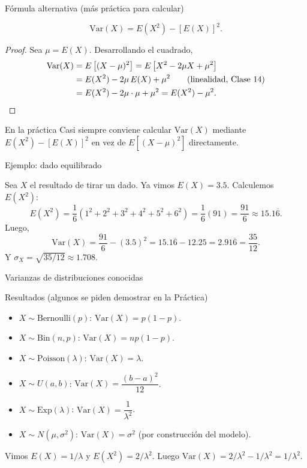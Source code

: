 \documentclass[aspectratio=169,11pt]{beamer}
\begin{document}
\begin{frame}{Fórmula alternativa (más práctica para calcular)}
\begin{theorem}
\[
\text{Var}(X) = E(X^2) - [E(X)]^2.
\]
\end{theorem}

\begin{proof}
Sea $\mu = E(X)$. Desarrollando el cuadrado,
\begin{align*}
\text{Var}(X) &= E\left[(X-\mu)^2\right] = E\left[X^2 - 2\mu X + \mu^2\right] \\
&= E(X^2) - 2\mu\, E(X) + \mu^2 \qquad \text{(linealidad, Clase 14)}\\
&= E(X^2) - 2\mu \cdot \mu + \mu^2 = E(X^2) - \mu^2. \qedhere
\end{align*}
\end{proof}

\begin{alertblock}{En la práctica}
Casi siempre conviene calcular $\text{Var}(X)$ mediante $E(X^2) - [E(X)]^2$ en vez de $E[(X-\mu)^2]$ directamente.
\end{alertblock}
\end{frame}

\begin{frame}{Ejemplo: dado equilibrado}
\begin{example}
Sea $X$ el resultado de tirar un dado. Ya vimos $E(X) = 3.5$. Calculemos $E(X^2)$:
\[
E(X^2) = \frac{1}{6}(1^2+2^2+3^2+4^2+5^2+6^2) = \frac{1}{6}(91) = \frac{91}{6} \approx 15.1\overline{6}.
\]
Luego,
\[
\text{Var}(X) = \frac{91}{6} - (3.5)^2 = 15.1\overline{6} - 12.25 = 2.91\overline{6} = \frac{35}{12}.
\]
Y $\sigma_X = \sqrt{35/12} \approx 1.708$.
\end{example}
\end{frame}

\begin{frame}{Varianzas de distribuciones conocidas}
\begin{block}{Resultados (algunos se piden demostrar en la Práctica)}
\begin{itemize}
\item $X \sim \text{Bernoulli}(p)$: $\text{Var}(X) = p(1-p)$.
\item $X \sim \text{Bin}(n,p)$: $\text{Var}(X) = np(1-p)$.
\item $X \sim \text{Poisson}(\lambda)$: $\text{Var}(X) = \lambda$.
\item $X \sim U(a,b)$: $\text{Var}(X) = \dfrac{(b-a)^2}{12}$.
\item $X \sim \text{Exp}(\lambda)$: $\text{Var}(X) = \dfrac{1}{\lambda^2}$.
\item $X \sim N(\mu,\sigma^2)$: $\text{Var}(X) = \sigma^2$ (por construcción del modelo).
\end{itemize}
\end{block}

\begin{example}
Vimos $E(X)=1/\lambda$ y $E(X^2) = 2/\lambda^2$. Luego $\text{Var}(X) = 2/\lambda^2 - 1/\lambda^2 = 1/\lambda^2$.
\end{example}
\end{frame}
\end{document}

